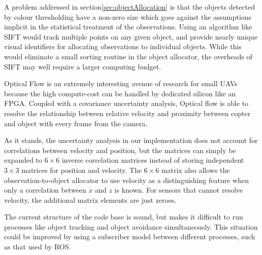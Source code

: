 \documentclass{article}
\begin{document}
  A problem addressed in section\ref{sec:objectAllocation} is that the objects detected by colour thresholding have a non-zero size which goes against the assumptions implicit in the statistical treatment of the observations.  Using an algorithm like SIFT would track multiple points on any given object, and provide nearly unique visual identifiers for allocating observations to individual objects.  While this would eliminate a small sorting routine in the object allocator, the overheads of SIFT may well require a larger computing budget.

  Optical Flow is an extremely interesting avenue of research for small UAVs because the high compute-cost can be handled by dedicated silicon like an FPGA.  Coupled with a covariance uncertainty analysis, Optical flow is able to resolve the relationship between relative velocity and proximity between copter and object with every frame from the camera.  
  
  As it stands, the uncertainty analysis in our implementation does not account for correlations between velocity and position, but the matrices can simply be expanded to \(6\times6\) inverse correlation matrices instead of storing independent \(3\times3\) matrices for position and velocity.  The \(6\times6\) matrix also allows the observation-to-object allocator to use velocity as a distinguishing feature when only a correlation between \(\dot{x}\) and \(z\) is known.  For sensors that cannot resolve velocity, the additional matrix elements are just zeroes.


  The current structure of the code base is sound, but makes it difficult to run processes like object tracking and object avoidance simultaneously.  This situation could be improved by using a subscriber model between different processes, such as that used by ROS.
\end{document}
